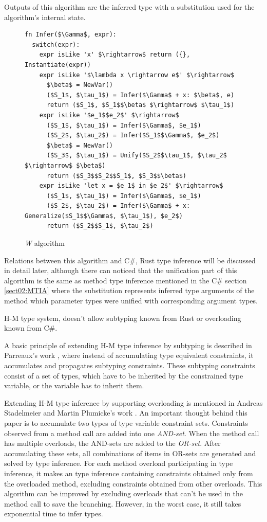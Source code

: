 Outputs of this algorithm are the inferred type with a substitution used for the algorithm's internal state. 
\begin{figure}
\begin{lstlisting}[style=myAlgo, mathescape=true]
fn Infer($\Gamma$, expr):
  switch(expr):
    expr isLike 'x' $\rightarrow$ return ({}, Instantiate(expr))
    expr isLike '$\lambda x \rightarrow e$' $\rightarrow$
      $\beta$ = NewVar()
      ($S_1$, $\tau_1$) = Infer($\Gamma$ + x: $\beta$, e)
      return ($S_1$, $S_1$$\beta$ $\rightarrow$ $\tau_1$)
    expr isLike '$e_1$$e_2$' $\rightarrow$
      ($S_1$, $\tau_1$) = Infer($\Gamma$, $e_1$)
      ($S_2$, $\tau_2$) = Infer($S_1$$\Gamma$, $e_2$)
      $\beta$ = NewVar()
      ($S_3$, $\tau_1$) = Unify($S_2$$\tau_1$, $\tau_2$ $\rightarrow$ $\beta$)
      return ($S_3$$S_2$$S_1$, $S_3$$\beta$)
    expr isLike 'let x = $e_1$ in $e_2$' $\rightarrow$
      ($S_1$, $\tau_1$) = Infer($\Gamma$, $e_1$)
      ($S_2$, $\tau_2$) = Infer($\Gamma$ + x: Generalize($S_1$$\Gamma$, $\tau_1$), $e_2$)
      return ($S_2$$S_1$, $\tau_2$)
\end{lstlisting}
\caption{\textit{W} algorithm}
\label{img16:w}
\end{figure}
\par
Relations between this algorithm and C\#, Rust type inference will be discussed in detail later, although there can noticed that the unification part of this algorithm is the same as method type inference mentioned in the C\# section \ref{sect02:MTIA} where the substitution represents inferred type arguments of the method which parameter types were unified with corresponding argument types.
\par
H-M type system, doesn't allow subtyping known from Rust or overloading known from C\#.  
\par
A basic principle of extending H-M type inference by subtyping is described in Parreaux's work \cite{paper:Parreaux}, where instead of accumulating type equivalent constraints, it accumulates and propagates subtyping constraints.
These subtyping constraints consist of a set of types, which have to be inherited by the constrained type variable, or the variable has to inherit them.
\par
Extending H-M type inference by supporting overloading is mentioned in Andreas Stadelmeier and Martin Plumicke's work \cite{paper:Overloading}.
An important thought behind this paper is to accumulate two types of type variable constraint sets.
Constraints observed from a method call are added into one \textit{AND-set}.
When the method call has multiple overloads, the AND-sets are added to the \textit{OR-set}.
After accumulating these sets, all combinations of items in OR-sets are generated and solved by type inference.
For each method overload participating in type inference, it makes an type inference containing constraints obtained only from the overloaded method, excluding constraints obtained from other overloads.
This algorithm can be improved by excluding overloads that can't be used in the method call to save the branching.
However, in the worst case, it still takes exponential time to infer types.

